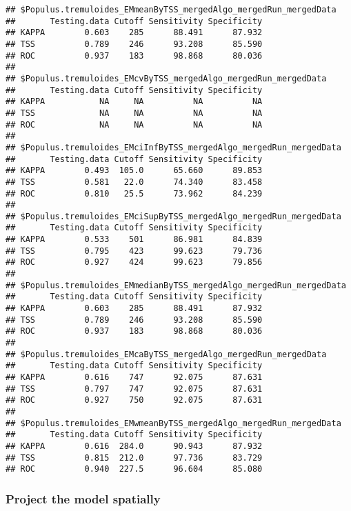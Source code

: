 \documentclass[]{article}
\begin{document}
\begin{verbatim}
## $Populus.tremuloides_EMmeanByTSS_mergedAlgo_mergedRun_mergedData
##       Testing.data Cutoff Sensitivity Specificity
## KAPPA        0.603    285      88.491      87.932
## TSS          0.789    246      93.208      85.590
## ROC          0.937    183      98.868      80.036
## 
## $Populus.tremuloides_EMcvByTSS_mergedAlgo_mergedRun_mergedData
##       Testing.data Cutoff Sensitivity Specificity
## KAPPA           NA     NA          NA          NA
## TSS             NA     NA          NA          NA
## ROC             NA     NA          NA          NA
## 
## $Populus.tremuloides_EMciInfByTSS_mergedAlgo_mergedRun_mergedData
##       Testing.data Cutoff Sensitivity Specificity
## KAPPA        0.493  105.0      65.660      89.853
## TSS          0.581   22.0      74.340      83.458
## ROC          0.810   25.5      73.962      84.239
## 
## $Populus.tremuloides_EMciSupByTSS_mergedAlgo_mergedRun_mergedData
##       Testing.data Cutoff Sensitivity Specificity
## KAPPA        0.533    501      86.981      84.839
## TSS          0.795    423      99.623      79.736
## ROC          0.927    424      99.623      79.856
## 
## $Populus.tremuloides_EMmedianByTSS_mergedAlgo_mergedRun_mergedData
##       Testing.data Cutoff Sensitivity Specificity
## KAPPA        0.603    285      88.491      87.932
## TSS          0.789    246      93.208      85.590
## ROC          0.937    183      98.868      80.036
## 
## $Populus.tremuloides_EMcaByTSS_mergedAlgo_mergedRun_mergedData
##       Testing.data Cutoff Sensitivity Specificity
## KAPPA        0.616    747      92.075      87.631
## TSS          0.797    747      92.075      87.631
## ROC          0.927    750      92.075      87.631
## 
## $Populus.tremuloides_EMwmeanByTSS_mergedAlgo_mergedRun_mergedData
##       Testing.data Cutoff Sensitivity Specificity
## KAPPA        0.616  284.0      90.943      87.932
## TSS          0.815  212.0      97.736      83.729
## ROC          0.940  227.5      96.604      85.080
\end{verbatim}

\subsubsection{Project the model
spatially}\label{project-the-model-spatially}
\end{document}

